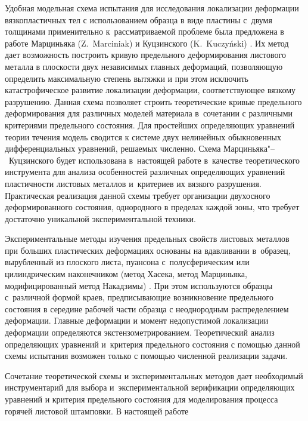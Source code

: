 Удобная модельная схема испытания для исследования локализации деформации вязкопластичных тел с использованием образца в виде пластины с~двумя толщинами \cite{keller:bib:ill} применительно к~рассматриваемой проблеме была предложена в работе Марциньяка  (Z.~Marciniak) и Куцзинского (K.~Kuczy\'nski) \cite{keller:bib:marc}. Их метод дает возможность построить кривую предельного деформирования листового металла в плоскости двух независимых главных деформаций, позволяющую определить максимальную степень вытяжки и при этом исключить катастрофическое развитие локализации деформации, соответствующее вязкому разрушению. Данная схема позволяет строить теоретические кривые предельного деформирования для различных моделей материала в~сочетании с различными критериями предельного состояния. Для простейших определяющих уравнений теории течения модель сводится к системе двух нелинейных обыкновенных дифференциальных уравнений, решаемых численно. Схема Марциньяка"--~Куцзинского будет использована в~настоящей работе в~качестве теоретического инструмента для анализа особенностей различных определяющих уравнений пластичности листовых металлов и~критериев их вязкого разрушения. Практическая реализация данной схемы требует организации  двухосного деформированного состояния, однородного в пределах каждой зоны, что требует достаточно уникальной экспериментальной техники. 



\pagebreak



Экспериментальные методы изучения предельных свойств листовых металлов при больших пластических деформациях основаны на вдавливании в~образец, вырубленный из плоского листа, пуансона с~полусферическим или цилиндрическим наконечником (метод Хасека, метод Марциньяка, модифицированный метод Накадзимы) \cite{keller:bib:iso, keller:bib:astmfld}. При этом используются образцы с~различной формой краев, предписывающие возникновение предельного состояния в середине рабочей части образца с неоднородным распределением деформации. Главные деформации и момент недопустимой локализации деформации определяются экстензометрированием. Теоретический анализ определяющих уравнений и~критерия предельного состояния с помощью данной схемы испытания возможен только с помощью численной реализации задачи. 



Сочетание теоретической схемы и экспериментальных методов дает необходимый инструментарий для выбора и~экспериментальной верификации оп\-ре\-деляющих уравнений и критерия предельного состояния для моделирования процесса горячей листовой штамповки. В настоящей работе 

